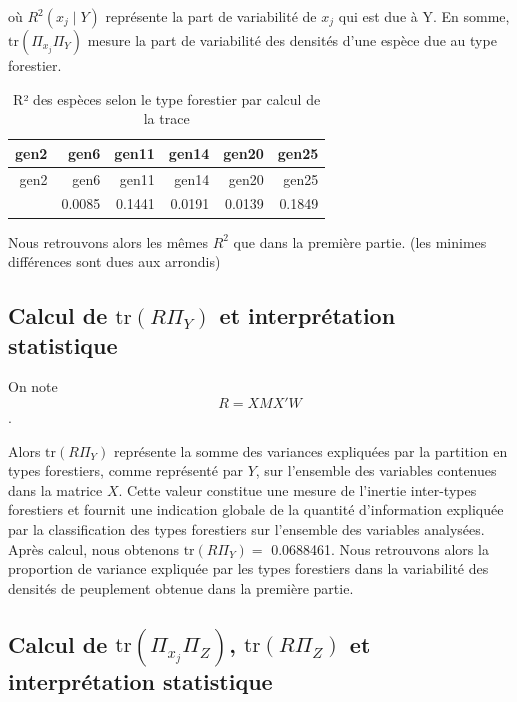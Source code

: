 \documentclass[
]{article}
\begin{document}
où \(R^2(x_j \mid Y)\) représente la part de variabilité de \({x_j}\)
qui est due à Y. En somme, \(\text{tr}(\Pi_{x_j} \Pi_Y)\) mesure la part
de variabilité des densités d'une espèce due au type forestier.

\begin{longtable}[]{@{}rrrrrr@{}}
\caption{R² des espèces selon le type forestier par calcul de la
trace}\tabularnewline
\toprule\noalign{}
gen2 & gen6 & gen11 & gen14 & gen20 & gen25 \\
\midrule\noalign{}
\endfirsthead
\toprule\noalign{}
gen2 & gen6 & gen11 & gen14 & gen20 & gen25 \\
\midrule\noalign{}
\endhead
\bottomrule\noalign{}
\endlastfoot
0.1327 & 0.0085 & 0.1441 & 0.0191 & 0.0139 & 0.1849 \\
\end{longtable}

Nous retrouvons alors les mêmes \(R^2\) que dans la première partie.
(les minimes différences sont dues aux arrondis)

\hypertarget{calcul-de-texttrr-pi_y-et-interpruxe9tation-statistique}{%
\subsection{\texorpdfstring{Calcul de \(\text{tr}(R \Pi_Y)\) et
interprétation
statistique}{Calcul de \textbackslash text\{tr\}(R \textbackslash Pi\_Y) et interprétation statistique}}\label{calcul-de-texttrr-pi_y-et-interpruxe9tation-statistique}}

On note \[ R = X M X' W \].

Alors \(\text{tr}(R \Pi_Y)\) représente la somme des variances
expliquées par la partition en types forestiers, comme représenté par
\(Y\), sur l'ensemble des variables contenues dans la matrice \(X\).
Cette valeur constitue une mesure de l'inertie inter-types forestiers et
fournit une indication globale de la quantité d'information expliquée
par la classification des types forestiers sur l'ensemble des variables
analysées. Après calcul, nous obtenons \(\text{tr}(R \Pi_Y) =\)
0.0688461. Nous retrouvons alors la proportion de variance expliquée par
les types forestiers dans la variabilité des densités de peuplement
obtenue dans la première partie.

\hypertarget{calcul-de-texttrpi_x_j-pi_z-texttrr-pi_z-et-interpruxe9tation-statistique}{%
\subsection{\texorpdfstring{Calcul de \(\text{tr}(\Pi_{x_j} \Pi_Z)\),
\(\text{tr}(R \Pi_Z)\) et interprétation
statistique}{Calcul de \textbackslash text\{tr\}(\textbackslash Pi\_\{x\_j\} \textbackslash Pi\_Z), \textbackslash text\{tr\}(R \textbackslash Pi\_Z) et interprétation statistique}}\label{calcul-de-texttrpi_x_j-pi_z-texttrr-pi_z-et-interpruxe9tation-statistique}}
\end{document}
